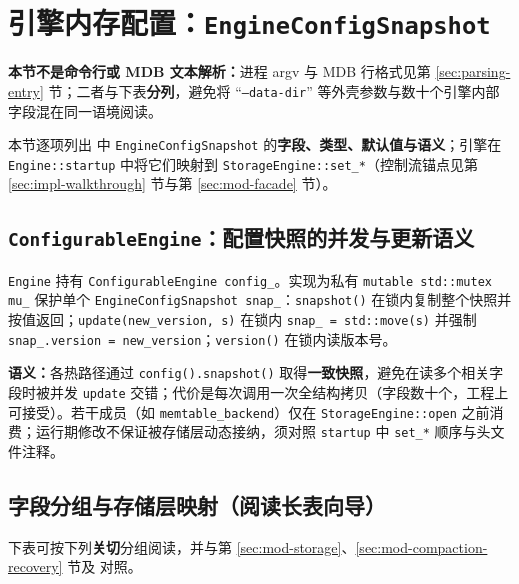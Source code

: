 \section{引擎内存配置：\texttt{EngineConfigSnapshot}}
\label{sec:runtime-params}

\textbf{本节不是命令行或 MDB 文本解析：}进程 argv 与 MDB 行格式见第 \ref{sec:parsing-entry} 节；二者与下表\textbf{分列}，避免将 ``\texttt{--data-dir}'' 等外壳参数与数十个引擎内部字段混在同一语境阅读。

本节逐项列出  中 \texttt{EngineConfigSnapshot} 的\textbf{字段、类型、默认值与语义}；引擎在 \texttt{Engine::startup} 中将它们映射到 \texttt{StorageEngine::set\_*}（控制流锚点见第 \ref{sec:impl-walkthrough} 节与第 \ref{sec:mod-facade} 节）。

\subsection{\texttt{ConfigurableEngine}：配置快照的并发与更新语义}

\texttt{Engine} 持有 \texttt{ConfigurableEngine config\_}。实现为私有 \texttt{mutable std::mutex mu\_} 保护单个 \texttt{EngineConfigSnapshot snap\_}：\texttt{snapshot()} 在锁内复制整个快照并按值返回；\texttt{update(new\_version, s)} 在锁内 \texttt{snap\_ = std::move(s)} 并强制 \texttt{snap\_.version = new\_version}；\texttt{version()} 在锁内读版本号。

\textbf{语义：}各热路径通过 \texttt{config().snapshot()} 取得\textbf{一致快照}，避免在读多个相关字段时被并发 \texttt{update} 交错；代价是每次调用一次全结构拷贝（字段数十个，工程上可接受）。若干成员（如 \texttt{memtable\_backend}）仅在 \texttt{StorageEngine::open} 之前消费；运行期修改不保证被存储层动态接纳，须对照 \texttt{startup} 中 \texttt{set\_*} 顺序与头文件注释。

\subsection{字段分组与存储层映射（阅读长表向导）}

下表可按下列\textbf{关切}分组阅读，并与第 \ref{sec:mod-storage}、\ref{sec:mod-compaction-recovery} 节及  对照。

